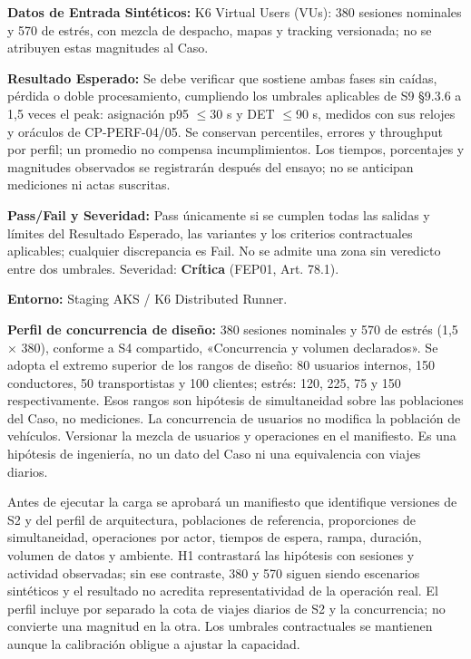 \par\noindent \textbf{Datos de Entrada Sintéticos:} K6 Virtual Users (VUs): 380 sesiones nominales y 570 de estrés, con mezcla de despacho, mapas y tracking versionada; no se atribuyen estas magnitudes al Caso.\par
\par\noindent \textbf{Resultado Esperado:} Se debe verificar que sostiene ambas fases sin caídas, pérdida o doble procesamiento, cumpliendo los umbrales aplicables de S9 §9.3.6 a 1,5 veces el peak: asignación p95 \(\le\)30 s y DET \(\le\)90 s, medidos con sus relojes y oráculos de CP-PERF-04/05. Se conservan percentiles, errores y throughput por perfil; un promedio no compensa incumplimientos. Los tiempos, porcentajes y magnitudes observados se registrarán después del ensayo; no se anticipan mediciones ni actas suscritas.\par
\par\noindent \textbf{Pass/Fail y Severidad:} Pass únicamente si se cumplen todas las salidas y límites del Resultado Esperado, las variantes y los criterios contractuales aplicables; cualquier discrepancia es Fail. No se admite una zona sin veredicto entre dos umbrales. Severidad: \textbf{Crítica} (FEP01, Art. 78.1).\par
\par\noindent \textbf{Entorno:} Staging AKS / K6 Distributed Runner.\par

\par\noindent \textbf{Perfil de concurrencia de diseño:} 380 sesiones nominales y 570 de estrés (1,5 × 380), conforme a S4 compartido, «Concurrencia y volumen declarados». Se adopta el extremo superior de los rangos de diseño: 80 usuarios internos, 150 conductores, 50 transportistas y 100 clientes; estrés: 120, 225, 75 y 150 respectivamente. Esos rangos son hipótesis de simultaneidad sobre las poblaciones del Caso, no mediciones. La concurrencia de usuarios no modifica la población de vehículos. Versionar la mezcla de usuarios y operaciones en el manifiesto. Es una hipótesis de ingeniería, no un dato del Caso ni una equivalencia con viajes diarios.\par

\par\noindent Antes de ejecutar la carga se aprobará un manifiesto que identifique versiones de S2 y del perfil de arquitectura, poblaciones de referencia, proporciones de simultaneidad, operaciones por actor, tiempos de espera, rampa, duración, volumen de datos y ambiente. H1 contrastará las hipótesis con sesiones y actividad observadas; sin ese contraste, 380 y 570 siguen siendo escenarios sintéticos y el resultado no acredita representatividad de la operación real. El perfil incluye por separado la cota de viajes diarios de S2 y la concurrencia; no convierte una magnitud en la otra. Los umbrales contractuales se mantienen aunque la calibración obligue a ajustar la capacidad.\par


